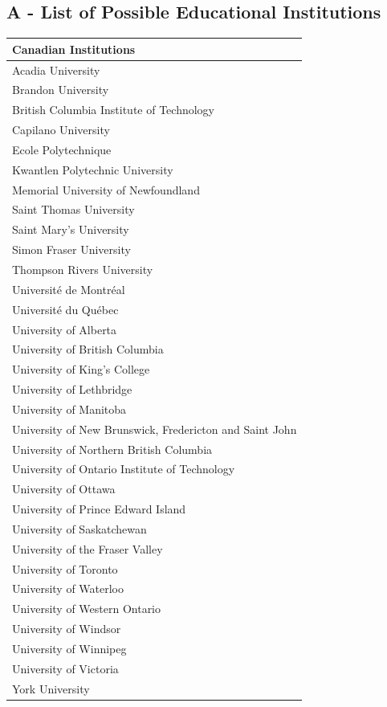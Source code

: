 \documentclass[titlepage]{article}
\begin{document}
\subsection{A - List of Possible Educational Institutions}
\begin{tabular}{l}
\textbf{Canadian Institutions} \\
\hline
Acadia University \\
Brandon University \\
British Columbia Institute of Technology \\
Capilano University \\
Ecole Polytechnique \\
Kwantlen Polytechnic University \\
Memorial University of Newfoundland \\
Saint Thomas University \\
Saint Mary's University \\
Simon Fraser University \\
Thompson Rivers University \\
Université de Montréal \\
Université du Québec \\
University of Alberta \\
University of British Columbia \\
University of King's College \\
University of Lethbridge \\
University of Manitoba \\
University of New Brunswick, Fredericton and Saint John \\
University of Northern British Columbia \\
University of Ontario Institute of Technology \\
University of Ottawa \\
University of Prince Edward Island \\
University of Saskatchewan \\
University of the Fraser Valley \\
University of Toronto \\
University of Waterloo \\
University of Western Ontario \\
University of Windsor \\
University of Winnipeg \\
University of Victoria \\
York University \\	 
\end{tabular}
\end{document}
